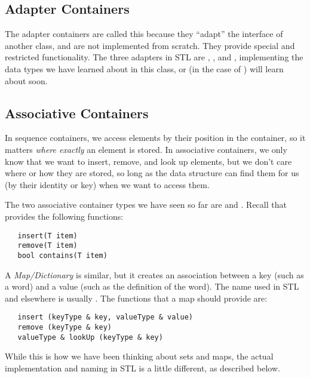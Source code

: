 \subsection{Adapter Containers}
The adapter containers are called this because they ``adapt'' the
interface of another class, and are not implemented from scratch.
They provide special and restricted functionality.
The three adapters in STL are , , and 
, implementing the data types we have learned
about in this class, or (in the case of ) will
learn about soon.

\subsection{Associative Containers}
In sequence containers, we access elements by their position in the
container, so it matters \emph{where exactly} an element is stored.
In associative containers, we only know that we want to insert,
remove, and look up elements, but we don't care where or how they are
stored, so long as the data structure can find them for us (by their
identity or key) when we want to access them.

The two associative container types we have seen so far are
 and . Recall that 
provides the following functions:
	
\begin{verbatim}
   insert(T item)
   remove(T item)
   bool contains(T item)
\end{verbatim}
			
A \emph{Map/Dictionary} is similar, but it creates an association between
a key (such as a word) and a value (such as the definition of the word).
The name used in STL and elsewhere is usually .
The functions that a map should provide are:
			
\begin{verbatim}
   insert (keyType & key, valueType & value)
   remove (keyType & key)
   valueType & lookUp (keyType & key)
\end{verbatim}
			
While this is how we have been thinking about sets and maps, the
actual implementation and naming in STL is a little different, as
described below.


